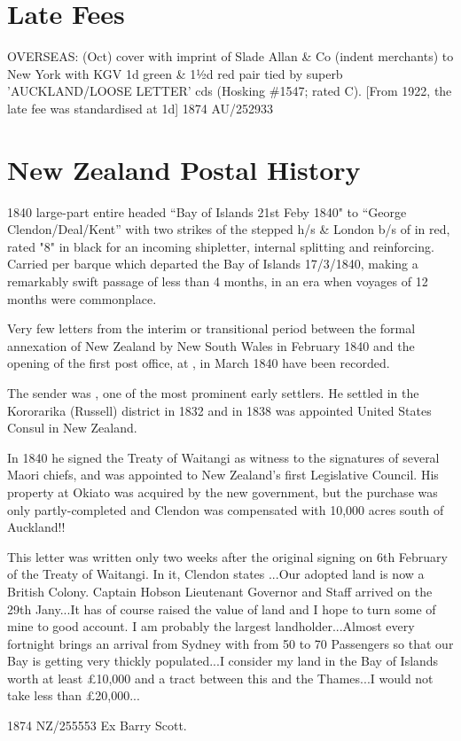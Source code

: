 \documentclass[justified]{tufte-book}
\begin{document}
\chapter{Late Fees}

%
{OVERSEAS: (Oct) cover with imprint of Slade Allan \& Co (indent merchants) to New York with KGV 1d green & 1½d red pair tied by superb 'AUCKLAND/LOOSE LETTER' cds (Hosking \#1547; rated C). [From 1922, the late fee was standardised at 1d]}%
{1874}%
{AU/252933}%
{}%
{}
{}%
{}%




\chapter{New Zealand Postal History}
%
{1840 large-part entire headed ``Bay of Islands 21st Feby 1840" to ``George Clendon/Deal/Kent'' with two strikes of the stepped  h/s \& London b/s of  in red, rated "8" in black for an incoming shipletter, internal splitting and reinforcing. Carried per barque  which departed the Bay of Islands 17/3/1840, making a remarkably swift passage of less than 4 months, in an era when voyages of 12 months were commonplace. 

Very few letters from the interim or transitional period between the formal annexation of New Zealand by New South Wales in February 1840 and the opening of the first post office, at , in March 1840 have been recorded. 

The sender was , one of the most prominent early settlers. He settled in the Kororarika (Russell) district in 1832 and in 1838 was appointed United States Consul in New Zealand. 

In 1840 he signed the Treaty of Waitangi as witness to the signatures of several Maori chiefs, and was appointed to New Zealand's first Legislative Council. His property at Okiato was acquired by the new government, but the purchase was only partly-completed and Clendon was compensated with 10,000 acres south of Auckland!! 

This letter was written only two weeks after the original signing on 6th February of the Treaty of Waitangi. In it, Clendon states
\quote
...Our adopted land is now a British Colony. Captain Hobson Lieutenant Governor and Staff arrived on the 29th Jany...It has of course raised the value of land and I hope to turn some of mine to good account. I am probably the largest landholder...Almost every fortnight brings an arrival from Sydney with from 50 to 70 Passengers so that our Bay is getting very thickly populated...I consider my land in the Bay of Islands worth at least \pounds10,000 and a tract between this and the Thames...I would not take less than \pounds20,000...
\endquote
}%
{1874}%
{NZ/255553}%
{Ex Barry Scott.}%
{}
{}%
{}%
\end{document}
